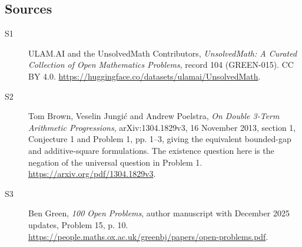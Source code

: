 \documentclass[11pt]{article}
\begin{document}
\subsection{Sources}
\begin{description}
\item[\hypertarget{source:104:1}{S1}] ULAM.AI and the UnsolvedMath Contributors, \emph{UnsolvedMath: A Curated Collection of Open Mathematics Problems}, record 104 (GREEN-015). CC BY 4.0. \url{https://huggingface.co/datasets/ulamai/UnsolvedMath}.
\item[\hypertarget{source:104:2}{S2}] Tom Brown, Veselin Jungić and Andrew Poelstra, \emph{On Double 3-Term Arithmetic Progressions}, arXiv:1304.1829v3, 16 November 2013, section 1, Conjecture 1 and Problem 1, pp. 1--3, giving the equivalent bounded-gap and additive-square formulations. The existence question here is the negation of the universal question in Problem 1. \url{https://arxiv.org/pdf/1304.1829v3}.
\item[\hypertarget{source:104:3}{S3}] Ben Green, \emph{100 Open Problems}, author manuscript with December 2025 updates, Problem 15, p. 10. \url{https://people.maths.ox.ac.uk/greenbj/papers/open-problems.pdf}.
\end{description}
\label{end:104}
\end{document}
